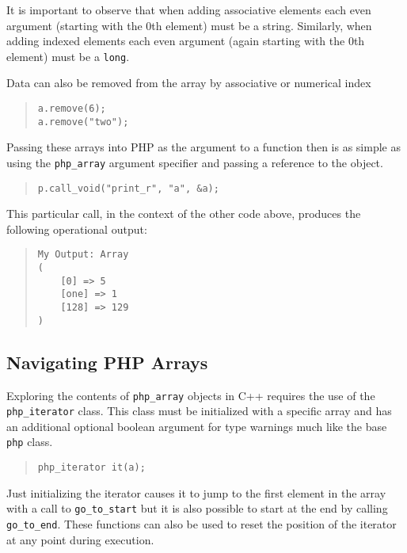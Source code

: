 \documentclass[11pt,titlepage]{article}
\begin{document}
It is important to observe that when adding associative elements each even argument (starting with the 0th element) must be a string. Similarly, when adding indexed elements each even argument (again starting with the 0th element) must be a \verb|long|.

Data can also be removed from the array by associative or numerical index

\begin{quote}
\begin{verbatim}
a.remove(6);
a.remove("two");
\end{verbatim}
\end{quote}

Passing these arrays into PHP as the argument to a function then is as simple as using the \verb|php_array| argument specifier and passing a reference to the object.

\begin{quote}
\verb|p.call_void("print_r", "a", &a);|
\end{quote}

This particular call, in the context of the other code above, produces the following operational output:

\begin{quote}
\begin{verbatim}
My Output: Array
(
    [0] => 5
    [one] => 1
    [128] => 129
)
\end{verbatim}
\end{quote}

\subsection{Navigating PHP Arrays}

Exploring the contents of \verb|php_array| objects in C++ requires the use of the \verb|php_iterator| class. This class must be initialized with a specific array and has an additional optional boolean argument for type warnings much like the base \verb|php| class.

\begin{quote}
\verb|php_iterator it(a);|
\end{quote}

Just initializing the iterator causes it to jump to the first element in the array with a call to \verb|go_to_start| but it is also possible to start at the end by calling \verb|go_to_end|. These functions can also be used to reset the position of the iterator at any point during execution.
\end{document}
